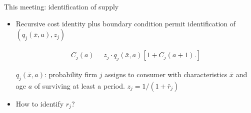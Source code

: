 \documentclass[10pt,aspectratio=169]{beamer}
\begin{document}
\begin{frame}{This meeting: identification of supply}

\begin{itemize}
    \item  Recursive cost identity plus boundary condition permit identification of $(q_j(\bar{x}, a), z_j)$
    
    \begin{align}
    C_j(a) = z_j \cdot q_j(\bar{x}, a)[1+C_j(a+1).]
    \end{align}

$q_j(\bar{x}, a)$: probability firm $j$ assigns to consumer with characteristics $\bar{x}$ and age $a$ of surviving at least a period.  $ z_j = 1/(1+\bar{r}_j)$

    
    \item How to identify $r_j$? 
     
\end{itemize}
\end{frame}
\end{document}
